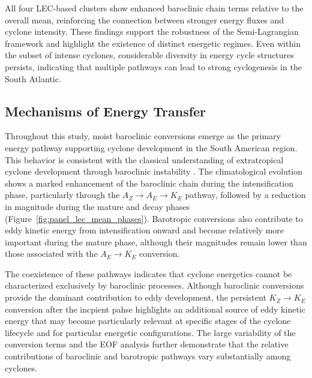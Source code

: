 \documentclass[pdflatex,sn-chicago]{sn-jnl}%
\theoremstyle{plain}
\theoremstyle{definition}
\theoremstyle{remark}
\theoremstyle{definition}
\begin{document}
All four LEC-based clusters show enhanced baroclinic chain terms relative to the overall mean, reinforcing the connection between stronger energy fluxes and cyclone intensity. These findings support the robustness of the Semi-Lagrangian framework and highlight the existence of distinct energetic regimes. Even within the subset of intense cyclones, considerable diversity in energy cycle structures persists, indicating that multiple pathways can lead to strong cyclogenesis in the South Atlantic.

\subsection{Mechanisms of Energy Transfer}

Throughout this study, moist baroclinic conversions emerge as the primary energy pathway supporting cyclone development in the South American region. This behavior is consistent with the classical understanding of extratropical cyclone development through baroclinic instability \citep{bjerknes1922life,charney1964growth,hoskins1990existence}. The climatological evolution shows a marked enhancement of the baroclinic chain during the intensification phase, particularly through the $A_Z \rightarrow A_E \rightarrow K_E$ pathway, followed by a reduction in magnitude during the mature and decay phases (Figure~\ref{fig:panel_lec_mean_phases}). Barotropic conversions also contribute to eddy kinetic energy from intensification onward and become relatively more important during the mature phase, although their magnitudes remain lower than those associated with the $A_E \rightarrow K_E$ conversion.

The coexistence of these pathways indicates that cyclone energetics cannot be characterized exclusively by baroclinic processes. Although baroclinic conversions provide the dominant contribution to eddy development, the persistent $K_Z \rightarrow K_E$ conversion after the incpient pahse highlights an additional source of eddy kinetic energy that may become particularly relevant at specific stages of the cyclone lifecycle and for particular energetic configurations. The large variability of the conversion terms and the EOF analysis further demonstrate that the relative contributions of baroclinic and barotropic pathways vary substantially among cyclones.
\end{document}
